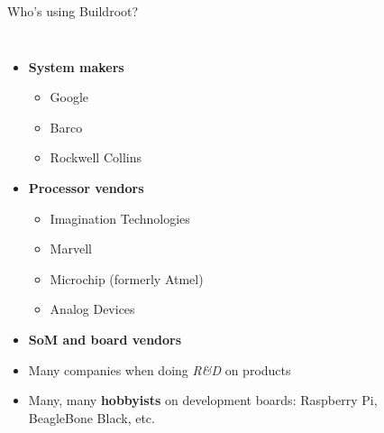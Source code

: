\begin{frame}{Who's using Buildroot?}
  \begin{columns}
    \begin{itemize}
    \item {\bf System makers}
      \begin{itemize}
      \item Google
      \item Barco
      \item Rockwell Collins
      \end{itemize}
    \item {\bf Processor vendors}
      \begin{itemize}
      \item Imagination Technologies
      \item Marvell
      \item Microchip (formerly Atmel)
      \item Analog Devices
      \end{itemize}
    \item {\bf SoM and board vendors}
    \item Many companies when doing {\em R\&D} on products
    \item Many, many {\bf hobbyists} on development boards:
      Raspberry Pi, BeagleBone Black, etc.
  \end{itemize}
  \\
  \\

\end{columns}
\end{frame}
